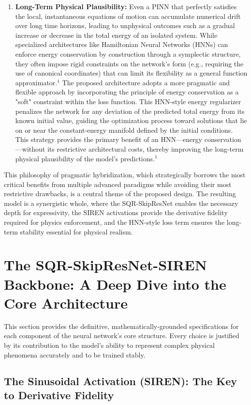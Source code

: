 \documentclass{article}
\begin{document}
\begin{enumerate}
    \item \textbf{Long-Term Physical Plausibility:} Even a PINN that perfectly satisfies the local, instantaneous equations of motion can accumulate numerical drift over long time horizons, leading to unphysical outcomes such as a gradual increase or decrease in the total energy of an isolated system. While specialized architectures like Hamiltonian Neural Networks (HNNs) can enforce energy conservation by construction through a symplectic structure, they often impose rigid constraints on the network's form (e.g., requiring the use of canonical coordinates) that can limit its flexibility as a general function approximator.$^1$ The proposed architecture adopts a more pragmatic and flexible approach by incorporating the principle of energy conservation as a "soft" constraint within the loss function. This HNN-style energy regularizer penalizes the network for any deviation of the predicted total energy from its known initial value, guiding the optimization process toward solutions that lie on or near the constant-energy manifold defined by the initial conditions. This strategy provides the primary benefit of an HNN—energy conservation—without its restrictive architectural costs, thereby improving the long-term physical plausibility of the model's predictions.$^1$
\end{enumerate}

This philosophy of pragmatic hybridization, which strategically borrows the most critical benefits from multiple advanced paradigms while avoiding their most restrictive drawbacks, is a central theme of the proposed design. The resulting model is a synergistic whole, where the SQR-SkipResNet enables the necessary depth for expressivity, the SIREN activations provide the derivative fidelity required for physics enforcement, and the HNN-style loss term ensures the long-term stability essential for physical realism.

\section{The SQR-SkipResNet-SIREN Backbone: A Deep Dive into the Core Architecture}

This section provides the definitive, mathematically-grounded specifications for each component of the neural network's core structure. Every choice is justified by its contribution to the model's ability to represent complex physical phenomena accurately and to be trained stably.

\subsection{The Sinusoidal Activation (SIREN): The Key to Derivative Fidelity}
\end{document}

